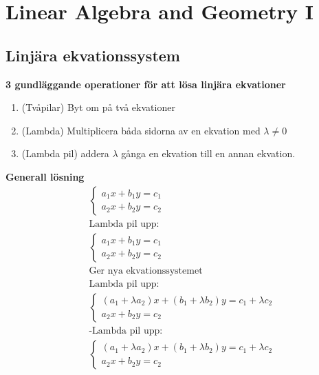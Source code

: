 \chapter{Linear Algebra and Geometry I}

\newpage

\begin{multicols}{2}
\section{Linjära ekvationssystem}

\textbf{3 gundläggande operationer för att lösa linjära ekvationer}
\begin{enumerate}
  \item (Tvåpilar) Byt om på två ekvationer
  \item (Lambda) Multiplicera båda sidorna av en ekvation med $\lambda \neq 0$
  \item (Lambda pil) addera $\lambda$ gånga en ekvation till en annan ekvation.
\end{enumerate}


\textbf{Generall lösning}
\begin{align*}
  &\left\{\begin{array}{l}
  a_{1} x+b_{1} y=c_{1} \\
  a_{2} x+b_{2} y=c_{2}
  \end{array}\right. \\
  &\text{Lambda pil upp:} \\
  &\left\{\begin{array}{l}
  a_{1} x+b_{1} y=c_{1} \\
  a_{2} x+b_{2} y=c_{2}
  \end{array}\right. \\
  &\text{Ger nya ekvationssystemet} \\
  &\text{Lambda pil upp:} \\
  &\left\{\begin{array}{l}
  (a_{1}+\lambda a_{2})x + (b_{1}+\lambda b_{2})y=c_{1} + \lambda c_{2} \\
  a_{2} x+b_{2} y=c_{2}
  \end{array}\right. \\
  &\text{-Lambda pil upp:} \\
  &\left\{\begin{array}{l}
  (a_{1}+\lambda a_{2})x + (b_{1}+\lambda b_{2})y=c_{1} + \lambda c_{2} \\
  a_{2} x+b_{2} y=c_{2}
  \end{array}\right.
\end{align*}


\end{multicols}
